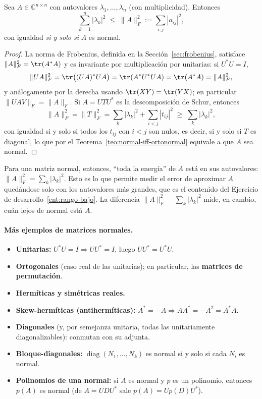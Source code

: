 \begin{theorem}\label{teo:desig-schur}
Sea $A\in\mathbb{C}^{n\times n}$ con autovalores $\lambda_1,\dots,\lambda_n$
(con multiplicidad). Entonces
\[
\sum_{k=1}^{n}|\lambda_k|^{2}\;\le\;\|A\|_F^{2}:=\sum_{i,j}|a_{ij}|^{2},
\]
con igualdad \emph{si y solo si} $A$ es normal.
\end{theorem}

\begin{proof}
La norma de Frobenius, definida en la Sección~\ref{sec:frobenius}, satisface
$\|A\|_F^{2}=\tr(A^{*}A)$ y es invariante por multiplicación por unitarias: si
$U^{*}U=I$,
\[
\|UA\|_F^{2}=\tr\big((UA)^{*}UA\big)=\tr(A^{*}U^{*}UA)=\tr(A^{*}A)=\|A\|_F^{2},
\]
y análogamente por la derecha usando $\tr(XY)=\tr(YX)$; en particular
$\|UAV\|_F=\|A\|_F$. Si $A=UTU^{*}$ es la
descomposición de Schur, entonces
\[
\|A\|_F^{2}=\|T\|_F^{2}=\sum_{k}|\lambda_k|^{2}+\sum_{i<j}|t_{ij}|^{2}
\;\ge\;\sum_{k}|\lambda_k|^{2},
\]
con igualdad si y solo si todos los $t_{ij}$ con $i<j$ son nulos, es decir,
si y solo si $T$ es diagonal, lo que por el Teorema~\ref{teo:normal-iff-ortonormal}
equivale a que $A$ sea normal.
\end{proof}

\begin{remark}
Para una matriz normal, entonces, ``toda la energía'' de $A$ está en sus autovalores:
$\|A\|_F^{2}=\sum_k|\lambda_k|^{2}$. Esto es lo que permite medir el error de
aproximar $A$ quedándose solo con los autovalores más grandes, que es el contenido
del Ejercicio de desarrollo~\ref{ent:rango-bajo}.
La diferencia $\|A\|_F^{2}-\sum_k|\lambda_k|^{2}$ mide, en cambio, cuán lejos de
normal está $A$.
\end{remark}

\paragraph{Más ejemplos de matrices normales.}
\begin{itemize}
\item \textbf{Unitarias:} \(U^{*}U=I\Rightarrow UU^{*}=I\), luego \(UU^{*}=U^{*}U\).
\item \textbf{Ortogonales} (caso real de las unitarias); en particular, las
      \textbf{matrices de permutación}.   %
\item \textbf{Hermíticas y simétricas reales.}
\item \textbf{Skew-hermíticas (antihermíticas):} \(A^{*}=-A\Rightarrow AA^{*}=-A^{2}=A^{*}A\).
\item \textbf{Diagonales} (y, por semejanza unitaria, todas las unitariamente
      diagonalizables): conmutan con su adjunta.
\item \textbf{Bloque-diagonales:} \(\operatorname{diag}(N_{1},\dots,N_{k})\) es normal
      si y solo si cada \(N_{i}\) es normal.
\item \textbf{Polinomios de una normal:} si \(A\) es normal y \(p\) es un polinomio,
      entonces \(p(A)\) es normal (de \(A=UDU^{*}\) sale \(p(A)=Up(D)U^{*}\)).
\end{itemize}


